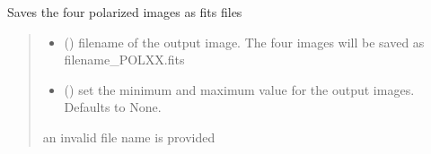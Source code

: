 \documentclass[letterpaper,10pt,english]{sphinxmanual}
\begin{document}
\begin{fulllineitems}
\begin{fulllineitems}
\end{fulllineitems}


\begin{fulllineitems}
\label{\detokenize{micropolarray:micropolarray.micropol_image.MicropolImage.save_single_pol_images}}
\pysigstartsignatures
{}
\pysigstopsignatures
\sphinxAtStartPar
Saves the four polarized images as fits files
\begin{quote}\begin{description}
\begin{itemize}
\item {} 
\sphinxAtStartPar
{} () \textendash{} filename of the output image. The four images will be saved as filename\_POLXX.fits

\item {} 
\sphinxAtStartPar
{} (\sphinxstyleliteralemphasis{\sphinxupquote{{[}}}\sphinxstyleliteralemphasis{\sphinxupquote{, }}\sphinxstyleliteralemphasis{\sphinxupquote{{]}}}\sphinxstyleliteralemphasis{\sphinxupquote{, }}) \textendash{} set the minimum and maximum value for the output images. Defaults to None.

\end{itemize}

\sphinxAtStartPar
{} \textendash{} an invalid file name is provided

\end{description}\end{quote}


\end{fulllineitems}
\end{fulllineitems}
\end{document}

